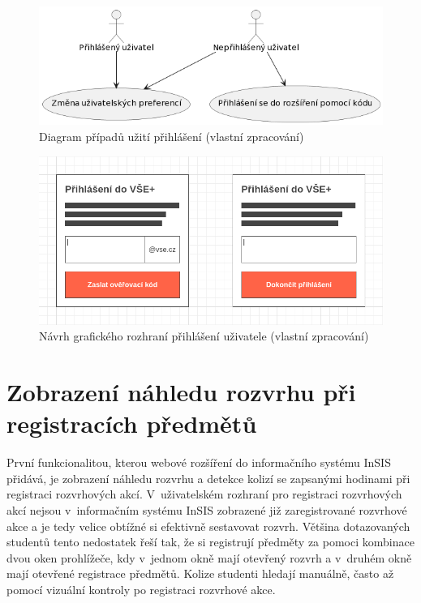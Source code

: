 \begin{figure}[htbp!]\centering
    \includegraphics[width=\textwidth]{img/uc-prihlaseni.png}
    \caption{Diagram případů užití přihlášení (vlastní zpracování)}
    \label{fig:usecase-prihlaseni}
\end{figure}

\begin{figure}[htbp!]\centering
    \includegraphics[width=\textwidth]{img/wireframe-autentikace.png}
    \caption{Návrh grafického rozhraní přihlášení uživatele (vlastní zpracování)}
    \label{fig:autentikace-wireframe}
\end{figure}


\section{Zobrazení náhledu rozvrhu při registracích předmětů}

První funkcionalitou, kterou webové rozšíření do informačního systému InSIS přidává, je zobrazení náhledu rozvrhu a detekce kolizí se zapsanými hodinami při registraci rozvrhových akcí. V~uživatelském rozhraní pro registraci rozvrhových akcí nejsou v~informačním systému InSIS zobrazené již zaregistrované rozvrhové akce a je tedy velice obtížné si efektivně sestavovat rozvrh. Většina dotazovaných studentů tento nedostatek řeší tak, že si registrují předměty za pomoci kombinace dvou oken prohlížeče, kdy v~jednom okně mají otevřený rozvrh a v~druhém okně mají otevřené registrace předmětů. Kolize studenti hledají manuálně, často až pomocí vizuální kontroly po registraci rozvrhové akce.

